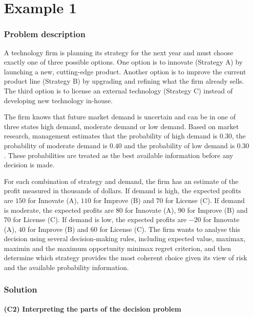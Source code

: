 \chapter{Example 1}\label{example-1}
	
	\subsection{Problem description}\label{example-1-problem}
	
	A technology firm is planning its strategy for the next year and must choose exactly one of three possible options.
	One option is to innovate (Strategy A) by launching a new, cutting-edge product. Another option is to improve the current product line
	(Strategy B) by upgrading and refining what the firm already sells. The third option is to license an external technology (Strategy C)
	instead of developing new technology in-house.
	
	The firm knows that future market demand is uncertain and can be in one of three states high demand, moderate demand or low demand.
	Based on market research, management estimates that the probability of high demand is \(0.30\), the probability of moderate demand is \(0.40\)
	and the probability of low demand is \(0.30\). These probabilities are treated as the best available information before any decision is made.
	
	For each combination of strategy and demand, the firm has an estimate of the profit measured in thousands of dollars.
	If demand is high, the expected profits are \(150\) for Innovate (A), \(110\) for Improve (B) and \(70\) for License (C).
	If demand is moderate, the expected profits are \(80\) for Innovate (A), \(90\) for Improve (B) and \(70\) for License (C).
	If demand is low, the expected profits are \(-20\) for Innovate (A), \(40\) for Improve (B) and \(60\) for License (C).
	The firm wants to analyse this decision using several decision-making rules, including expected value, maximax, maximin
	and the maximum opportunity minimax regret criterion, and then determine which strategy provides the most coherent choice
	given its view of risk and the available probability information.
	
	\subsection{Solution}
	
	\subsubsection{(C2) Interpreting the parts of the decision problem}\label{example-1-c2}
	
